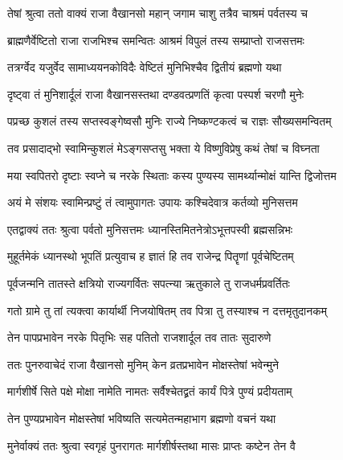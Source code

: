 \twolineshloka
{तेषां श्रुत्वा ततो वाक्यं राजा वैखानसो महान्}
{जगाम चाशु तत्रैव चाश्रमं पर्वतस्य च}%

\twolineshloka
{ब्राह्मणैर्वेष्टितो राजा राजभिश्च समन्वितः}
{आश्रमं विपुलं तस्य सम्प्राप्तो राजसत्तमः}%

\twolineshloka
{तत्रर्ग्वेद यजुर्वेद सामाध्ययनकोविदैः}
{वेष्टितं मुनिभिश्चैव द्वितीयं ब्रह्मणो यथा}%

\twolineshloka
{दृष्ट्वा तं मुनिशार्दूलं राजा वैखानसस्तथा}
{दण्डवत्प्रणतिं कृत्वा पस्पर्श चरणौ मुनेः}%

\twolineshloka
{पप्रच्छ कुशलं तस्य सप्तस्वङ्गेष्वसौ मुनिः}
{राज्ये निष्कण्टकत्वं च राज्ञः सौख्यसमन्वितम्}%


\twolineshloka
{तव प्रसादाद्भो स्वामिन्कुशलं मेऽङ्गसप्तसु}
{भक्ता ये विष्णुविप्रेषु कथं तेषां च विघ्नता}%

\twolineshloka
{मया स्वपितरो दृष्टाः स्वप्ने च नरके स्थिताः}
{कस्य पुण्यस्य सामर्थ्यान्मोक्षं यान्ति द्विजोत्तम}%

\twolineshloka
{अयं मे संशयः स्वामिन्प्रष्टुं तं त्वामुपागतः}
{उपायः कश्चिदेवात्र कर्तव्यो मुनिसत्तम}%

\twolineshloka
{एतद्वाक्यं ततः श्रुत्वा पर्वतो मुनिसत्तमः}
{ध्यानस्तिमितनेत्रोऽभूत्तपस्वी ब्रह्मसन्निभः}%

\twolineshloka
{मुहूर्तमेकं ध्यानस्थो भूपतिं प्रत्युवाच ह}
{ज्ञातं हि तव राजेन्द्र पितॄणां पूर्वचेष्टितम्}%

\twolineshloka
{पूर्वजन्मनि तातस्ते क्षत्रियो राज्यगर्वितः}
{सपत्न्या ऋतुकाले तु राजधर्मप्रवर्तितः}%

\twolineshloka
{गतो ग्रामे तु तां त्यक्त्वा कार्यार्थी निजयोषितम्}
{तव पित्रा तु तस्याश्च न दत्तमृतुदानकम्}%

\twolineshloka
{तेन पापप्रभावेन नरके पितृभिः सह}
{पतितो राजशार्दूल तव तातः सुदारुणे}%

\twolineshloka
{ततः पुनरुवाचेदं राजा वैखानसो मुनिम्}
{केन व्रतप्रभावेन मोक्षस्तेषां भवेन्मुने}%


\twolineshloka
{मार्गशीर्षे सिते पक्षे मोक्षा नामेति नामतः}
{सर्वैश्चेतद्व्रतं कार्यं पित्रे पुण्यं प्रदीयताम्}%

\twolineshloka
{तेन पुण्यप्रभावेन मोक्षस्तेषां भविष्यति}
{सत्यमेतन्महाभाग ब्रह्मणो वचनं यथा}%

\twolineshloka
{मुनेर्वाक्यं ततः श्रुत्वा स्वगृहं पुनरागतः}
{मार्गशीर्षस्तथा मासः प्राप्तः कष्टेन तेन वै}%

